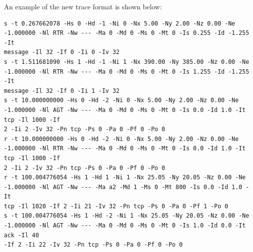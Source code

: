 An example of the new trace format is shown below:
\begin{verbatim}
s -t 0.267662078 -Hs 0 -Hd -1 -Ni 0 -Nx 5.00 -Ny 2.00 -Nz 0.00 -Ne
-1.000000 -Nl RTR -Nw --- -Ma 0 -Md 0 -Ms 0 -Mt 0 -Is 0.255 -Id -1.255 -It
message -Il 32 -If 0 -Ii 0 -Iv 32
s -t 1.511681090 -Hs 1 -Hd -1 -Ni 1 -Nx 390.00 -Ny 385.00 -Nz 0.00 -Ne
-1.000000 -Nl RTR -Nw --- -Ma 0 -Md 0 -Ms 0 -Mt 0 -Is 1.255 -Id -1.255 -It
message -Il 32 -If 0 -Ii 1 -Iv 32
s -t 10.000000000 -Hs 0 -Hd -2 -Ni 0 -Nx 5.00 -Ny 2.00 -Nz 0.00 -Ne
-1.000000 -Nl AGT -Nw --- -Ma 0 -Md 0 -Ms 0 -Mt 0 -Is 0.0 -Id 1.0 -It tcp -Il 1000 -If
2 -Ii 2 -Iv 32 -Pn tcp -Ps 0 -Pa 0 -Pf 0 -Po 0
r -t 10.000000000 -Hs 0 -Hd -2 -Ni 0 -Nx 5.00 -Ny 2.00 -Nz 0.00 -Ne
-1.000000 -Nl RTR -Nw --- -Ma 0 -Md 0 -Ms 0 -Mt 0 -Is 0.0 -Id 1.0 -It tcp -Il 1000 -If
2 -Ii 2 -Iv 32 -Pn tcp -Ps 0 -Pa 0 -Pf 0 -Po 0
r -t 100.004776054 -Hs 1 -Hd 1 -Ni 1 -Nx 25.05 -Ny 20.05 -Nz 0.00 -Ne
-1.000000 -Nl AGT -Nw --- -Ma a2 -Md 1 -Ms 0 -Mt 800 -Is 0.0 -Id 1.0 -It
tcp -Il 1020 -If 2 -Ii 21 -Iv 32 -Pn tcp -Ps 0 -Pa 0 -Pf 1 -Po 0
s -t 100.004776054 -Hs 1 -Hd -2 -Ni 1 -Nx 25.05 -Ny 20.05 -Nz 0.00 -Ne
-1.000000 -Nl AGT -Nw --- -Ma 0 -Md 0 -Ms 0 -Mt 0 -Is 1.0 -Id 0.0 -It ack -Il 40
-If 2 -Ii 22 -Iv 32 -Pn tcp -Ps 0 -Pa 0 -Pf 0 -Po 0 
\end{verbatim}

